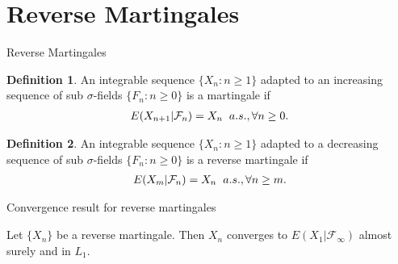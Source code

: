\documentclass{beamer}
\theoremstyle{definition}
\newtheorem{Def}{Definition}
\numberwithin{Def}{section}
\begin{document}
\section{Reverse Martingales}
\begin{frame}{Reverse Martingales}
\begin{Def}
An integrable sequence $\{X_n: n\ge 1\}$ adapted to an increasing sequence of sub $\sigma$-fields $\{F_n: n\ge 0\}$ is a martingale if
\begin{align*}
 E(X_{n+1}|\mathcal{F}_n)=X_n \hspace{0.2cm} a.s., \forall n\ge0.
\end{align*}
\end{Def}
\begin{Def}
An integrable sequence $\{X_n: n\ge 1\}$ adapted to a decreasing sequence of sub $\sigma$-fields $\{F_n: n\ge 0\}$ is a reverse martingale if
\begin{align*}
 E(X_m|\mathcal{F}_n)=X_n \hspace{0.2cm} a.s., \forall n\ge m.
\end{align*}
\end{Def}
\end{frame}
\begin{frame}{Convergence result for reverse martingales}
\begin{theorem}\label{conv_rm}
Let $\{X_n\}$ be a reverse martingale. Then $X_n$ converges to $E(X_1|\mathcal{F}_{\infty})$ almost surely and in $L_1$. 
\end{theorem}
\end{frame}
\end{document}
